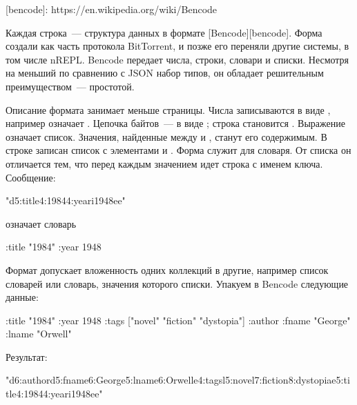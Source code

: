 [bencode]: https://en.wikipedia.org/wiki/Bencode

Каждая строка~--- структура данных в формате [Bencode][bencode]. Форма создали как часть протокола BitTorrent, и позже его переняли другие системы, в том числе nREPL. Bencode передает числа, строки, словари и списки. Несмотря на меньший по сравнению с JSON набор типов, он обладает решительным преимуществом~--- простотой.

Описание формата занимает меньше страницы. Числа записываются в виде , например  означает . Цепочка байтов~--- в виде ; строка  становится . Выражение  означает список. Значения, найденные между  и , станут его содержимым. В строке  записан список с элементами  и . Форма  служит для словаря. От списка он отличается тем, что перед каждым значением идет строка с именем ключа. Сообщение:

\begin{english}
  \begin{text}
"d5:title4:19844:yeari1948ee"
  \end{text}
\end{english}

означает словарь

\begin{english}
  \begin{clojure}
{:title "1984" :year 1948}
  \end{clojure}
\end{english}

Формат допускает вложенность одних коллекций в другие, например список словарей или словарь, значения которого списки. Упакуем в Bencode следующие данные:

\begin{english}
  \begin{clojure}
{:title "1984"
 :year 1948
 :tags ["novel" "fiction" "dystopia"]
 :author {:fname "George" :lname "Orwell"}}
  \end{clojure}
\end{english}

Результат:

\begin{english}
  \begin{clojure}
"d6:authord5:fname6:George5:lname6:Orwelle4:tagsl5:novel7:fiction8:dystopiae5:title4:19844:yeari1948ee"
  \end{clojure}
\end{english}

